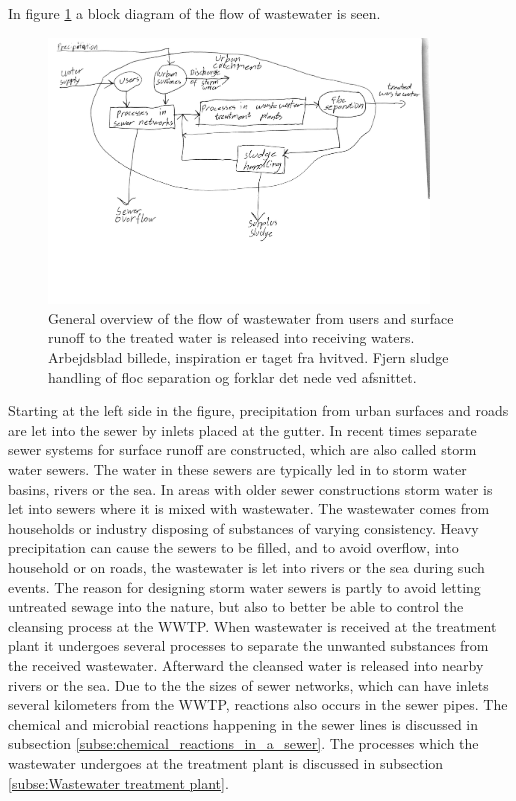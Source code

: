 In figure \ref{fig:sewer_overview_of_the_different_parts} a block diagram of the flow of wastewater is seen.
\begin{figure}[H]
\centering
\includegraphics[width=0.9\textwidth]{report/introduction/pictures/sewer_process2.pdf}
\caption{General overview of the flow of wastewater from users and surface runoff to the treated water is released into receiving waters. Arbejdsblad billede, inspiration er taget fra hvitved. Fjern sludge handling of floc separation og forklar det nede ved afsnittet.}
\label{fig:sewer_overview_of_the_different_parts}
\end{figure}

Starting at the left side in the figure, precipitation from urban surfaces and roads are let into the sewer by inlets placed at the gutter. In recent times separate sewer systems for surface runoff are constructed, which are also called storm water sewers. The water in these sewers are typically led in to storm water basins, rivers or the sea. In areas with older sewer constructions storm water is let into sewers where it is mixed with wastewater. The wastewater comes from households or industry disposing of substances of varying consistency. Heavy precipitation can cause the sewers to be filled, and to avoid overflow, into household or on roads, the wastewater is let into rivers or the sea during such events. 
The reason for designing storm water sewers is partly to avoid letting untreated sewage into the nature, but also to better be able to control the cleansing process at the WWTP. %
When wastewater is received at the treatment plant it undergoes several processes to separate the unwanted substances from the received wastewater. Afterward the cleansed water is released into nearby rivers or the sea.
Due to the the sizes of sewer networks, which can have inlets several kilometers from the WWTP, reactions also occurs in the sewer pipes.
The chemical and microbial reactions happening in the sewer lines is discussed in subsection \ref{subse:chemical_reactions_in_a_sewer}. The processes which the wastewater undergoes at the treatment plant is discussed in subsection \ref{subse:Wastewater treatment plant}.  

